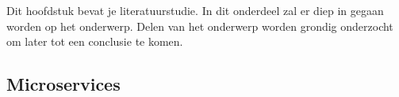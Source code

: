 \chapter{}
\label{ch:stand-van-zaken}



Dit hoofdstuk bevat je literatuurstudie. In dit onderdeel zal er diep in gegaan worden op het onderwerp. Delen van het onderwerp worden grondig onderzocht om later tot een conclusie te komen. 

\section{Microservices}
